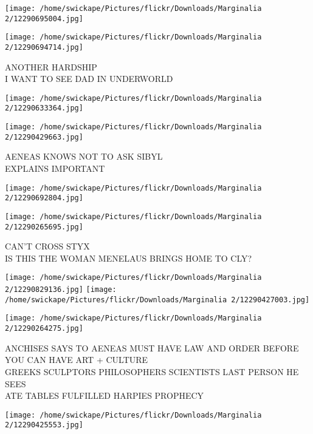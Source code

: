 \documentclass[10pt,letterpaper]{article}
\begin{document}
\texttt{[image: /home/swickape/Pictures/flickr/Downloads/Marginalia 2/12290695004.jpg]}

\vspace{0.25in}
\texttt{[image: /home/swickape/Pictures/flickr/Downloads/Marginalia 2/12290694714.jpg]}

ANOTHER HARDSHIP\\
I WANT TO SEE DAD IN UNDERWORLD\\
\pagebreak

\texttt{[image: /home/swickape/Pictures/flickr/Downloads/Marginalia 2/12290633364.jpg]}

\vspace{0.25in}
\texttt{[image: /home/swickape/Pictures/flickr/Downloads/Marginalia 2/12290429663.jpg]}

AENEAS KNOWS NOT TO ASK SIBYL\\
EXPLAINS IMPORTANT\\
\pagebreak

\texttt{[image: /home/swickape/Pictures/flickr/Downloads/Marginalia 2/12290692804.jpg]}

\vspace{0.25in}
\texttt{[image: /home/swickape/Pictures/flickr/Downloads/Marginalia 2/12290265695.jpg]}

CAN'T CROSS STYX\\
IS THIS THE WOMAN MENELAUS BRINGS HOME TO CLY?\\
\pagebreak

\texttt{[image: /home/swickape/Pictures/flickr/Downloads/Marginalia 2/12290829136.jpg]}
\texttt{[image: /home/swickape/Pictures/flickr/Downloads/Marginalia 2/12290427003.jpg]}

\vspace{0.25in}
\texttt{[image: /home/swickape/Pictures/flickr/Downloads/Marginalia 2/12290264275.jpg]}

ANCHISES SAYS TO AENEAS MUST HAVE LAW AND ORDER BEFORE YOU CAN HAVE ART + CULTURE\\
GREEKS SCULPTORS PHILOSOPHERS SCIENTISTS LAST PERSON HE SEES\\
ATE TABLES FULFILLED HARPIES PROPHECY\\
\pagebreak

\texttt{[image: /home/swickape/Pictures/flickr/Downloads/Marginalia 2/12290425553.jpg]}
\end{document}
